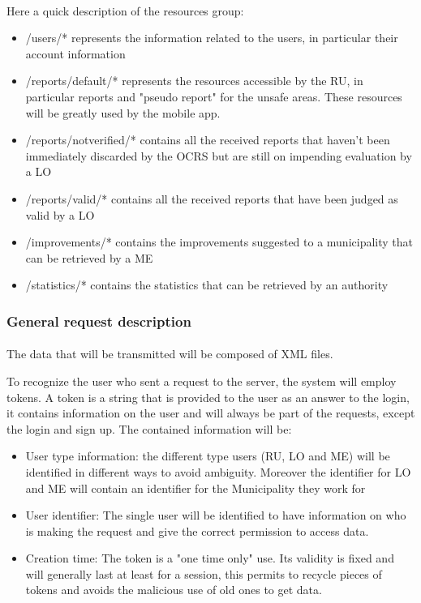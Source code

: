 					\paragraph{}
						Here a quick description of the resources group:
						\begin{itemize}
							\item {\ttfamily /users/*} represents the information related to the users, in particular their account information
							\item {\ttfamily /reports/default/*} represents the resources accessible by the RU, in particular reports and "pseudo report" for the unsafe areas. These resources will be greatly used by the mobile app.
							\item {\ttfamily /reports/notverified/*} contains all the received reports that haven't been immediately discarded by the OCRS but are still on impending evaluation by a LO
							\item {\ttfamily /reports/valid/*} contains all the received reports that have been judged as valid by a LO
							\item {\ttfamily /improvements/*} contains the improvements suggested to a municipality that can be retrieved by a ME
							\item {\ttfamily /statistics/*} contains the statistics that can be retrieved by an authority
						\end{itemize}
				\subsubsection{General request description}
					\paragraph{}
						The data that will be transmitted will be composed of XML files.
						
						To recognize the user who sent a request to the server, the system will employ tokens. A token is a string that is provided to the user as an answer to the login, it contains information on the user and will always be part of the requests, except the login and sign up.
						The contained information will be:
						\begin{itemize}
							\item User type information: the different type users (RU, LO and ME) will be identified in different ways to avoid ambiguity. Moreover the identifier for LO and ME will contain an identifier for the Municipality they work for
							\item User identifier: The single user will be identified to have information on who is making the request and give the correct permission to access data.
							\item Creation time: The token is a "one time only" use. Its validity is fixed and will generally last at least for a session, this permits to recycle pieces of tokens and avoids the malicious use of old ones to get data.
						\end{itemize}
				\clearpage
